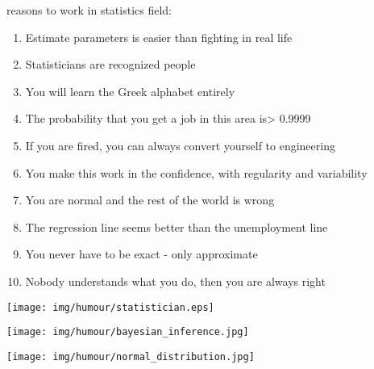  reasons to work in statistics field:
\begin{enumerate}
	\item Estimate parameters is easier than fighting in real life

	\item Statisticians are recognized people

	\item You will learn the Greek alphabet entirely

	\item The probability that you get a job in this area is> 0.9999

	\item If you are fired, you can always convert yourself to engineering

	\item You make this work in the confidence, with regularity and variability

	\item You are normal and the rest of the world is wrong

	\item The regression line seems better than the unemployment line

	\item You never have to be exact - only approximate

	\item Nobody understands what you do, then you are always right
\end{enumerate} 

	\begin{center}\underline{\hspace{5 cm}}\end{center}
	\begin{center}
	\texttt{[image: img/humour/statistician.eps]}
	\end{center}
	
	\begin{center}\underline{\hspace{5 cm}}\end{center}		
	\begin{center}
	\texttt{[image: img/humour/bayesian\_inference.jpg]}
	\end{center}
	
	\begin{center}\underline{\hspace{5 cm}}\end{center}
	\begin{center}
	\texttt{[image: img/humour/normal\_distribution.jpg]}
	\end{center}
	
